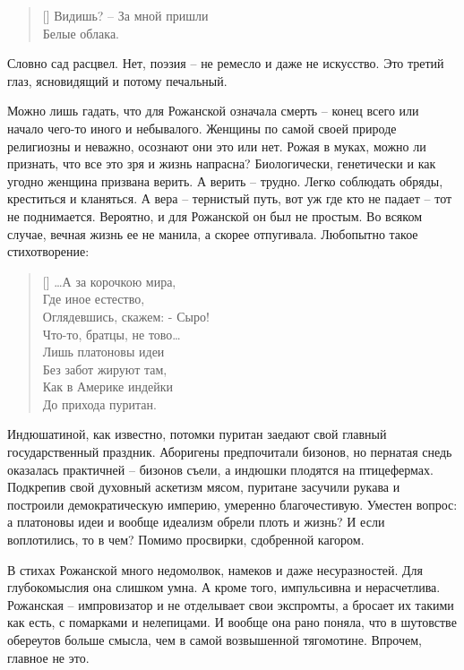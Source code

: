 \documentclass[12pt,a5paper,twoside]{article}
\begin{document}
\settowidth{\versewidth}{Видишь? -- За мной пришли}
\begin{verse}[\versewidth]
Видишь? -- За мной пришли\\
Белые облака.
\end{verse}

Словно сад расцвел. Нет, поэзия -- не ремесло и даже не искусство. 
Это третий глаз, ясновидящий и потому печальный.

Можно лишь гадать, что для Рожанской означала смерть -- конец всего или начало 
чего-то иного и небывалого. Женщины по самой своей природе религиозны и 
неважно, осознают они это или нет. Рожая в муках, можно ли признать, что 
все это зря и жизнь напрасна? Биологически, генетически и как угодно женщина призвана верить. 
А верить -- трудно. Легко соблюдать обряды, креститься и кланяться. А вера -- тернистый путь, 
вот уж где кто не падает -- тот не поднимается. Вероятно, и для Рожанской он был не простым. 
Во всяком случае, вечная жизнь ее не манила, а скорее отпугивала. Любопытно такое стихотворение:
 
\settowidth{\versewidth}{…А за корочкою мира,}
\begin{verse}[\versewidth]
…А за корочкою мира,\\
Где иное естество,\\
Оглядевшись, скажем: - Сыро!\\
Что-то, братцы, не тово…\\
Лишь платоновы идеи\\
Без забот жируют там,\\
Как в Америке индейки\\
До прихода пуритан.
\end{verse}

Индюшатиной, как известно, потомки пуритан заедают свой главный государственный праздник. Аборигены 
предпочитали бизонов, но пернатая снедь оказалась практичней -- бизонов съели, а индюшки плодятся 
на птицефермах. Подкрепив свой духовный аскетизм мясом, пуритане засучили рукава и построили 
демократическую империю, умеренно благочестивую. Уместен вопрос: а платоновы идеи и вообще 
идеализм обрели плоть и жизнь? И если воплотились, то в чем? Помимо просвирки, сдобренной кагором.
 
В стихах Рожанской много недомолвок, намеков и даже несуразностей. Для глубокомыслия она слишком 
умна. А кроме того, импульсивна и нерасчетлива. Рожанская -- импровизатор и не отделывает свои 
экспромты, а бросает их такими как есть, с помарками и нелепицами. И вообще она 
рано поняла, что в шутовстве обереутов больше смысла, чем в самой возвышенной тягомотине. Впрочем, главное не это.
\end{document}
